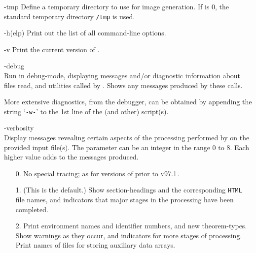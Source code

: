 \begin{htmllist}%
%
%
\item [ -tmp \Meta{path}\label{cs_tmpdir}]
Define a temporary directory to use for image generation.
If  is $0$, the standard temporary directory \texttt{/tmp}
is used.
%
%
\item [ -h(elp)\label{cs_optionlist}]
Print out the list of all command-line options.

%
\item [ -v\label{cs_showversion}] 
Print the current version of \latextohtml.

%
\item [ -debug\label{cs_debugmode}]
\\
Run in debug-mode, displaying messages and/or diagnostic information 
about files read, and utilities called by \latextohtml.
Shows any messages produced by these calls.%

%

More extensive diagnostics, from the \Perl{} debugger, 
can be obtained by appending the string `\texttt{-w-}' 
to the 1st line of the  (and other) \Perl{} script(s).


%
\item [ -verbosity \Meta{num}\label{cs_verbositylevel}] 
\\
Display messages revealing certain aspects of the processing
performed by \latextohtml{} on the provided input file(s).
The  parameter can be an integer in the range 0 to 8.
Each higher value adds to the messages produced.

\begin{itemize}
\item[0. ]
No special tracing; as for versions of \latextohtml{} prior to \textsc{v97.1}\,.

\item[1. ] (This is the default.)
Show section-headings and the corresponding \texttt{HTML} file names,
and indicators that major stages in the processing have been completed.

\item[2. ]
Print environment names and identifier numbers, and new theorem-types.
Show warnings as they occur, and indicators for more stages of processing.
Print names of files for storing auxiliary data arrays.


\end{itemize}
\end{htmllist}
